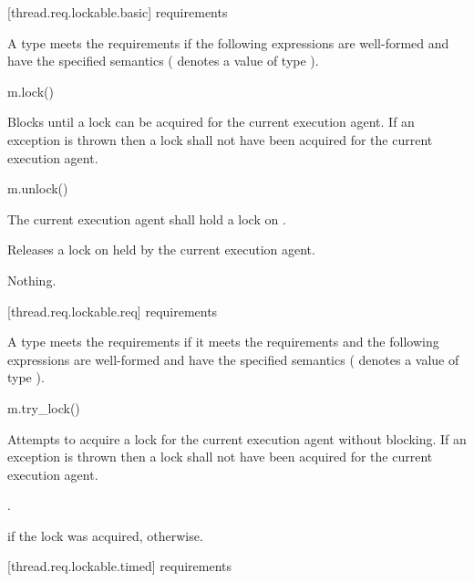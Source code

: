 [thread.req.lockable.basic]{ requirements}

\pnum
A type  meets the  requirements if the following expressions are
well-formed and have the specified semantics ( denotes a value of type ).

\begin{itemdecl}
m.lock()
\end{itemdecl}

\begin{itemdescr}
\pnum
\effects
Blocks until a lock can be acquired for the current execution agent. If an exception
is thrown then a lock shall not have been acquired for the current execution agent.
\end{itemdescr}

\begin{itemdecl}
m.unlock()
\end{itemdecl}

\begin{itemdescr}
\pnum
\requires The current execution agent shall hold a lock on .

\pnum
\effects
Releases a lock on  held by the current execution agent.

\pnum
\throws
Nothing.
\end{itemdescr}

[thread.req.lockable.req]{ requirements}

\pnum
A type  meets the  requirements if it meets the 
requirements and the following expressions are well-formed and have the specified semantics
( denotes a value of type ).

\begin{itemdecl}
m.try_lock()
\end{itemdecl}

\begin{itemdescr}
\pnum
\effects
Attempts to acquire a lock for the current execution agent without blocking. If an
exception is thrown then a lock shall not have been acquired for the current execution agent.

\pnum
\returntype {}.

\pnum
\returns
{} if the lock was acquired,  otherwise.
\end{itemdescr}

[thread.req.lockable.timed]{ requirements}

